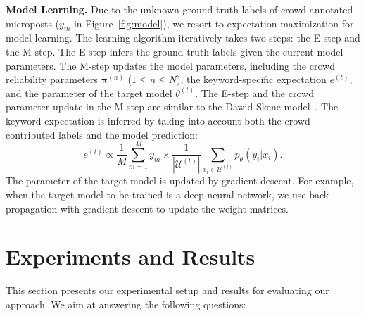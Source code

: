 \documentclass[letterpaper]{article}
\begin{document}
\smallskip
\noindent\textbf{Model Learning.} Due to the unknown ground truth labels of crowd-annotated microposts ($y_m$ in Figure~\ref{fig:model}), we resort to expectation maximization for model learning. The learning algorithm iteratively takes two steps: the E-step and the M-step. The E-step infers the ground truth labels given the current model parameters. The M-step updates the model parameters, including the crowd reliability parameters $\boldsymbol{\pi}^{(n)}$ ($1\leq n\leq N$), the keyword-specific expectation $e^{(t)}$, and the parameter of the target model $\theta^{(t)}$. The E-step and the crowd parameter update in the M-step are similar to the Dawid-Skene model~\cite{dawid1979maximum}. The keyword expectation is inferred by taking into account both the crowd-contributed labels and the model prediction:
\begin{equation}
    e^{(t)} \propto  \frac{1}{M}\sum_{m=1}^M y_m \times \frac{1}{|\mathcal{U}^{(t)}|} \sum_{x_i\in \mathcal{U}^{(t)}} p_\theta(y_i|x_i).%
\end{equation}
The parameter of the target model is updated by gradient descent. For example, when the target model to be trained is a deep neural network, we use back-propagation with gradient descent to update the weight matrices.


\section{Experiments and Results}
\label{sec:results}
This section presents our experimental setup and results for evaluating our approach. We aim at answering the following questions:
\end{document}
